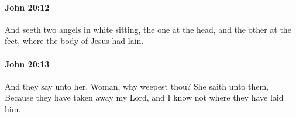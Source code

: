 		\paragraph{John 20:12} %
			\label{JOHN-20-12}

			And seeth two angels in white sitting, the one at the head, and the other at the feet, where the body of Jesus had lain.

			\begin{framed}
				\scriptsize
				\begin{compactdesc}
					\item[SBLG] 
				\end{compactdesc}
			\end{framed}

		\paragraph{John 20:13} %
			\label{JOHN-20-13}

			And they say unto her, Woman, why weepest thou? She saith unto them, Because they have taken away my Lord, and I know not where they have laid him.

